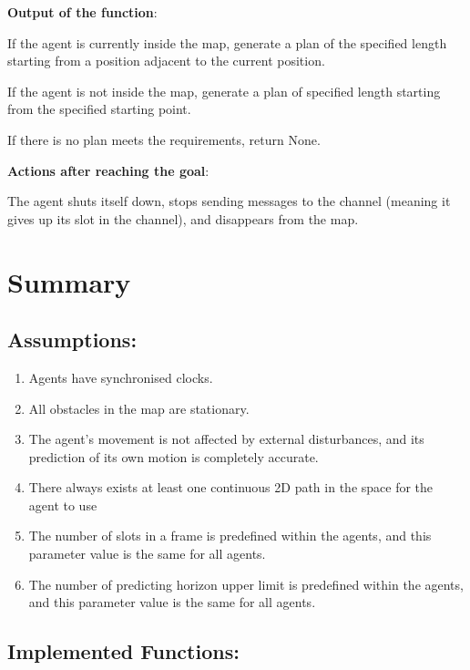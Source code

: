 \textbf{Output of the function}:

If the agent is currently inside the map, generate a plan of the specified length starting from a position adjacent to the current position.

If the agent is not inside the map, generate a plan of specified length starting from the specified starting point.

If there is no plan meets the requirements, return None.

\textbf{Actions after reaching the goal}:

The agent shuts itself down, stops sending messages to the channel (meaning it gives up its slot in the channel), and disappears from the map.

\section{Summary}

\subsection{Assumptions:}
\begin{enumerate}
    \item Agents have synchronised clocks.
    \item All obstacles in the map are stationary.
    \item The agent’s movement is not affected by external disturbances, and
    its prediction of its own motion is completely accurate.
    \item There always exists at least one continuous 2D path in the space
    for the agent to use
    \item  The number of slots in a frame is predefined within the agents, and
    this parameter value is the same for all agents.
    \item The number of predicting horizon upper limit is predefined within the
    agents, and this parameter value is the same for all agents.
\end{enumerate}

\subsection{Implemented Functions:}

